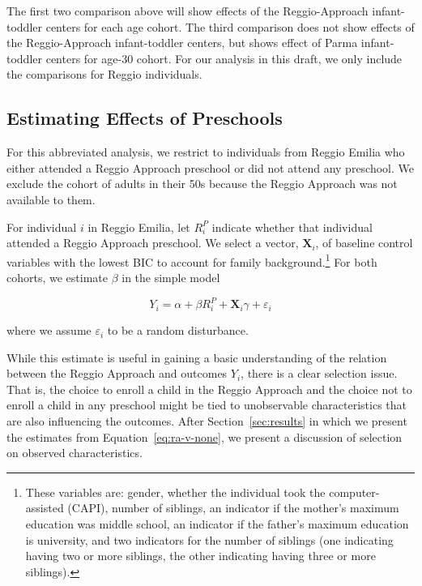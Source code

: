 The first two comparison above will show effects of the Reggio-Approach infant-toddler centers for each age cohort. The third comparison does not show effects of the Reggio-Approach infant-toddler centers, but shows effect of Parma infant-toddler centers for age-30 cohort. For our analysis in this draft, we only include the comparisons for Reggio individuals. 

\subsection{Estimating Effects of Preschools}
For this abbreviated analysis, we restrict to individuals from Reggio Emilia who either attended a Reggio Approach preschool or did not attend any preschool. We exclude the cohort of adults in their 50s because the Reggio Approach was not available to them.

For individual $i$ in Reggio Emilia, let $R_i^{P}$ indicate whether that individual attended a Reggio Approach preschool. We select a vector, $\bm{X}_i$, of baseline control variables with the lowest BIC to account for family background.\footnote{These variables are: gender, whether the individual took the computer-assisted (CAPI), number of siblings, an indicator if the mother's maximum education was middle school, an indicator if the father's maximum education is university, and two indicators for the number of siblings (one indicating having two or more siblings, the other indicating having three or more siblings).} For both cohorts, we estimate $\beta$ in the simple model

\begin{equation}
	Y_i = \alpha + \beta R_i^{P} + \bm{X}_i\gamma + \varepsilon_i
	\label{eq:ra-v-none}
\end{equation}

\noindent where we assume $\varepsilon_i$ to be a random disturbance. 

While this estimate is useful in gaining a basic understanding of the relation between the Reggio Approach and outcomes $Y_i$, there is a clear selection issue. That is, the choice to enroll a child in the Reggio Approach and the choice not to enroll a child in any preschool might be tied to unobservable characteristics that are also influencing the outcomes. After Section~\ref{sec:results} in which we present the estimates from Equation~\eqref{eq:ra-v-none}, we present a discussion of selection on observed characteristics.